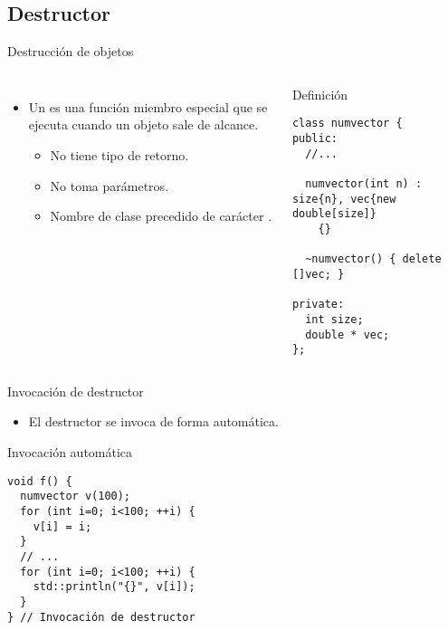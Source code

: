\subsection{Destructor}

\begin{frame}[t,fragile]{Destrucción de objetos}
\begin{columns}[T]

\begin{itemize}
  \item Un  es una función miembro especial que se
        ejecuta  cuando un objeto sale de
        alcance.
    \begin{itemize}
      \item No tiene tipo de retorno.
      \item No toma parámetros.
      \item Nombre de clase precedido de carácter \textbf{\cppid{~}}.
    \end{itemize}
\end{itemize}


\begin{block}{Definición}
\begin{lstlisting}
class numvector {
public:
  //...

  numvector(int n) : size{n}, vec{new double[size]}
    {}

  ~numvector() { delete []vec; }

private:
  int size;
  double * vec;
};
\end{lstlisting}
\end{block}

\end{columns}
\end{frame}

\begin{frame}[t,fragile]{Invocación de destructor}
\begin{itemize}
  \item El destructor se invoca de forma automática.
\end{itemize}

\begin{block}{Invocación automática}
\begin{lstlisting}
void f() {
  numvector v(100);
  for (int i=0; i<100; ++i) {
    v[i] = i;
  }
  // ...
  for (int i=0; i<100; ++i) {
    std::println("{}", v[i]);
  }
} // Invocación de destructor
\end{lstlisting}
\end{block}
\end{frame}
